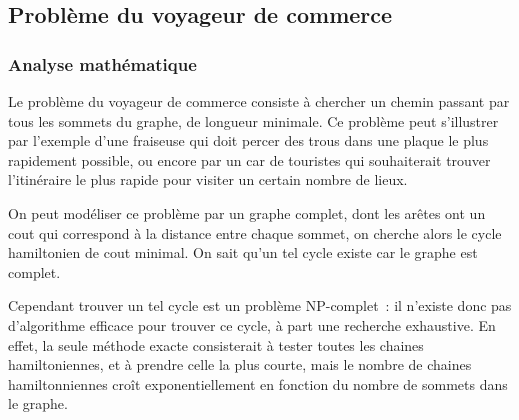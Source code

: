     \begin{center}
    \end{center}

\subsection{Problème du voyageur de commerce}\label{sec:tsp}
  \subsubsection{Analyse mathématique}
    Le problème du voyageur de commerce consiste à chercher un chemin passant
    par tous les sommets du graphe, de longueur minimale.
    Ce problème peut s'illustrer par l'exemple d'une
    fraiseuse qui doit percer des trous dans une plaque le plus
    rapidement possible, ou encore par un car de touristes qui souhaiterait
    trouver l'itinéraire le plus rapide pour visiter un certain nombre de lieux.

    On peut modéliser ce problème par un graphe complet, dont les arêtes ont un
    cout qui correspond à la distance entre chaque sommet, on cherche alors le
    cycle hamiltonien de cout minimal. On sait qu'un tel cycle existe car le
    graphe est complet.

    Cependant trouver un tel cycle est un problème NP-complet~: il n'existe
    donc pas d'algorithme efficace pour trouver ce cycle, à part une recherche
    exhaustive.
    En effet, la seule méthode exacte consisterait à tester toutes les chaines
    hamiltoniennes, et à prendre celle la plus courte, mais le nombre de chaines
    hamiltonniennes croît exponentiellement en fonction du nombre de sommets
    dans le graphe.

